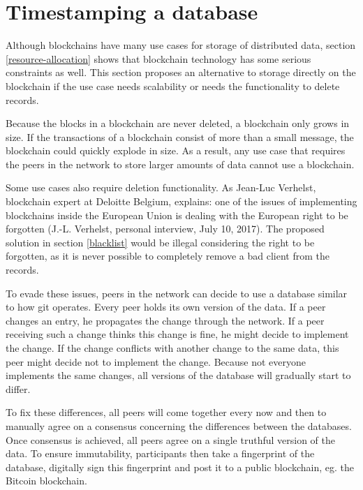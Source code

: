 \section{Timestamping a database}
\label{timestamping-db}


Although blockchains have many use cases for storage of distributed data, section \ref{resource-allocation} shows that blockchain technology has some serious constraints as well. This section proposes an alternative to storage directly on the blockchain if the use case needs scalability or needs the functionality to delete records. 

Because the blocks in a blockchain are never deleted, a blockchain only grows in size. If the transactions of a blockchain consist of more than a small message, the blockchain could quickly explode in size. As a result, any use case that requires the peers in the network to store larger amounts of data cannot use a blockchain.

Some use cases also require deletion functionality. As Jean-Luc Verhelst, blockchain expert at Deloitte Belgium, explains: one of the issues of implementing blockchains inside the European Union is dealing with the European right to be forgotten (J.-L. Verhelst, personal interview, July 10, 2017). The proposed solution in section \ref{blacklist} would be illegal considering the right to be forgotten, as it is never possible to completely remove a bad client from the records. 

To evade these issues, peers in the network can decide to use a database similar to how git operates. Every peer holds its own version of the data. If a peer changes an entry, he propagates the change through the network. If a peer receiving such a change thinks this change is fine, he might decide to implement the change. If the change conflicts with another change to the same data, this peer might decide not to implement the change. Because not everyone implements the same changes, all versions of the database will gradually start to differ. 

To fix these differences, all peers will come together every now and then to manually agree on a consensus concerning the differences between the databases. Once consensus is achieved, all peers agree on a single truthful version of the data. To ensure immutability, participants then take a fingerprint of the database, digitally sign this fingerprint and post it to a public blockchain, eg. the Bitcoin blockchain.

